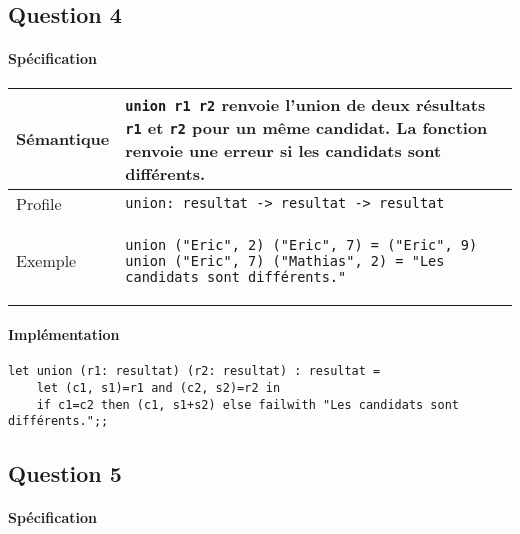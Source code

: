 \documentclass[french, 10pt, a4paper]{article}
\begin{document}
\subsection{Question 4}

\paragraph{Spécification}

\begin{center}
	\begin{tabular}{|p{2cm}|p{\dimexpr\linewidth-2cm-4\tabcolsep-3\arrayrulewidth}|}
		\hline
		Sémantique
		&
		\texttt{union r1 r2} renvoie l'union de deux résultats \texttt{r1} et \texttt{r2} pour un même candidat. La fonction renvoie une erreur si les candidats sont différents. %
%
		\\
		\hline
		Profile
		&
		\texttt{union: resultat -> resultat -> resultat}
%
		\\
		\hline
		Exemple
		&
		\begin{verbatim}
union ("Eric", 2) ("Eric", 7) = ("Eric", 9)
union ("Eric", 7) ("Mathias", 2) = "Les candidats sont différents."
		\end{verbatim}
%
		\\
		\hline
	\end{tabular}
\end{center}

\paragraph{Implémentation}

\begin{verbatim}
let union (r1: resultat) (r2: resultat) : resultat =
	let (c1, s1)=r1 and (c2, s2)=r2 in
	if c1=c2 then (c1, s1+s2) else failwith "Les candidats sont différents.";;
\end{verbatim}



\subsection{Question 5}

\paragraph{Spécification}
\end{document}
